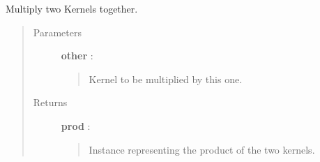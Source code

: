 \documentclass[letterpaper,10pt,english]{sphinxmanual}
\begin{document}
\begin{fulllineitems}
\begin{fulllineitems}
\begin{quote}
\begin{description}
\end{description}\end{quote}

\end{fulllineitems}


\begin{fulllineitems}
\label{gptools.kernel:gptools.kernel.core.Kernel.__mul__}
Multiply two Kernels together.
\begin{quote}\begin{description}
\item[{Parameters }] \leavevmode
\textbf{other} : {\hyperref[gptools.kernel:gptools.kernel.core.Kernel]{}}
\begin{quote}

Kernel to be multiplied by this one.
\end{quote}

\item[{Returns }] \leavevmode
\textbf{prod} : {\hyperref[gptools.kernel:gptools.kernel.core.ProductKernel]{}}
\begin{quote}

Instance representing the product of the two kernels.
\end{quote}

\end{description}\end{quote}

\end{fulllineitems}


\end{fulllineitems}

\end{document}
